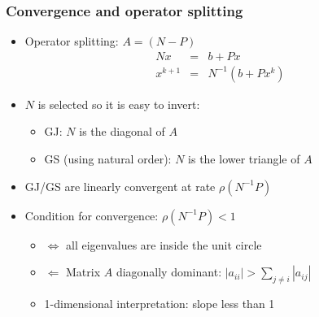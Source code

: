 \documentclass[bigger]{beamer}
\begin{document}
\begin{frame}%
\frametitle{Convergence and operator splitting}

\begin{itemize}
\item Operator splitting: $A=(N-P)$%
\begin{eqnarray*}
Nx &=&b+Px \\
x^{k+1} &=&N^{-1}(b+Px^{k})
\end{eqnarray*}

\item $N$ is selected so it is easy to invert:

\begin{itemize}
\item GJ: $N$ is the diagonal of $A$

\item GS (using natural order): $N$ is the lower triangle of $A$
\end{itemize}

\item GJ/GS are linearly convergent at rate $\rho (N^{-1}P)$

\item Condition for convergence: $\rho (N^{-1}P)<1$

\begin{itemize}
\item $\iff $ all eigenvalues are inside the unit circle

\item $\Leftarrow $ Matrix $A$ diagonally dominant: $\left\vert
a_{ii}\right\vert >\sum_{j\neq i}\left\vert a_{ij}\right\vert $

\item 1-dimensional interpretation: slope less than 1
\end{itemize}
\end{itemize}

\end{frame}%
\end{document}
